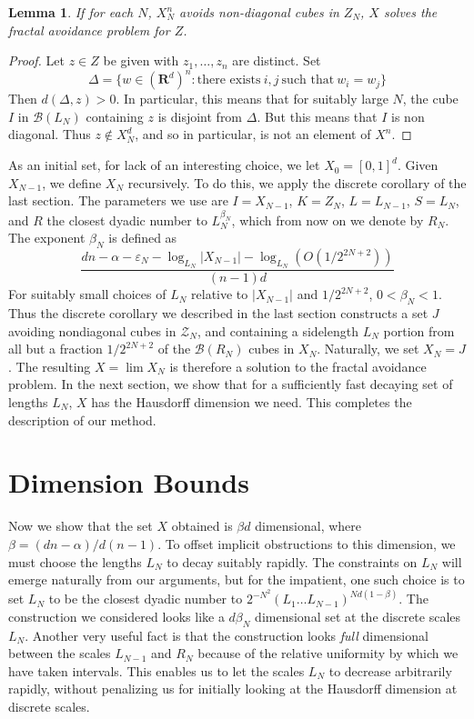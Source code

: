 \documentclass{article}
\theoremstyle{plain}
\newtheorem{lemma}{Lemma}
\theoremstyle{plain}
\begin{document}
\begin{multicols}{2}
\begin{lemma}
	If for each $N$, $X_N^n$ avoids non-diagonal cubes in $Z_N$, $X$ solves the fractal avoidance problem for $Z$.
\end{lemma}
\begin{proof}
	Let $z \in Z$ be given with $z_1, \dots, z_n$ are distinct. Set
	\[ \Delta = \{ w \in (\mathbf{R}^d)^n : \text{there exists}\ i,j\ \text{such that}\ w_i = w_j \} \]
	Then $d(\Delta,z) > 0$. In particular, this means that for suitably large $N$, the cube $I$ in $\mathcal{B}(L_N)$ containing $z$ is disjoint from $\Delta$. But this means that $I$ is non diagonal. Thus $z \not \in X_N^d$, and so in particular, is not an element of $X^n$.
\end{proof}

As an initial set, for lack of an interesting choice, we let $X_0 = [0,1]^d$. Given $X_{N-1}$, we define $X_N$ recursively. To do this, we apply the discrete corollary of the last section. The parameters we use are $I = X_{N-1}$, $K = Z_N$, $L = L_{N-1}$, $S = L_N$, and $R$ the closest dyadic number to $L_N^{\beta_N}$, which from now on we denote by $R_N$. The exponent $\beta_N$ is defined as
%
\[ \frac{dn - \alpha - \varepsilon_N - \log_{L_N} |X_{N-1}| - \log_{L_N}(O(1/2^{2N+2}))}{(n-1)d} \]
%
For suitably small choices of $L_N$ relative to $|X_{N-1}|$ and $1/2^{2N+2}$, $0 < \beta_N < 1$. Thus the discrete corollary we described in the last section constructs a set $J$ avoiding nondiagonal cubes in $\mathcal{Z}_N$, and containing a sidelength $L_N$ portion from all but a fraction $1/2^{2N+2}$ of the $\mathcal{B}(R_N)$ cubes in $X_N$. Naturally, we set $X_N = J$. The resulting $X = \lim X_N$ is therefore a solution to the fractal avoidance problem. In the next section, we show that for a sufficiently fast decaying set of lengths $L_N$, $X$ has the Hausdorff dimension we need. This completes the description of our method.

\section{Dimension Bounds}

Now we show that the set $X$ obtained is $\beta d$ dimensional, where $\beta = (dn - \alpha)/d(n-1)$. To offset implicit obstructions to this dimension, we must choose the lengths $L_N$ to decay suitably rapidly. The constraints on $L_N$ will emerge naturally from our arguments, but for the impatient, one such choice is to set $L_N$ to be the closest dyadic number to $2^{-N^2} \left( L_1 \dots L_{N-1} \right)^{Nd(1-\beta)}$. The construction we considered looks like a $d\beta_N$ dimensional set at the discrete scales $L_N$. Another very useful fact is that the construction looks {\it full} dimensional between the scales $L_{N-1}$ and $R_N$ because of the relative uniformity by which we have taken intervals. This enables us to let the scales $L_N$ to decrease arbitrarily rapidly, without penalizing us for initially looking at the Hausdorff dimension at discrete scales.


\end{multicols}
\end{document}

